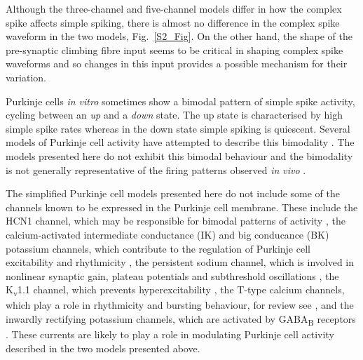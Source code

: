 \documentclass[utf8]{frontiersSCNS} %
\begin{document}
Although the three-channel and five-channel models differ in how the
complex spike affects simple spiking, there is almost no difference in
the complex spike waveform in the two models, Fig.~\ref{S2_Fig}. On
the other hand, the shape of the pre-synaptic climbing fibre input
seems to be critical in shaping complex spike waveforms and so changes
in this input provides a possible mechanism for their variation.

Purkinje cells \textsl{in vitro} sometimes show a bimodal pattern of
simple spike activity, cycling between an \textsl{up} and a
\textsl{down} state. The up state is characterised by high simple
spike rates whereas in the down state simple spiking is
quiescent. Several models of Purkinje cell activity have attempted to
describe this bimodality
\cite{Forrest2014,ForrestEtAl2012,LlinasSugimori1980b,LoewensteinEtAl2005,McKayEtAl2007,WilliamsEtAl2002}. The
models presented here do not exhibit this bimodal behaviour and the
bimodality is not generally representative of the firing patterns
observed \textsl{in vivo}
\cite{CerminaraRawson2004,McKayEtAl2007,SchonewilleEtAl2006}.

The simplified Purkinje cell models presented here do not include some
of the channels known to be expressed in the Purkinje cell
membrane. These include the HCN1 channel, which may be responsible for
bimodal patterns of activity \cite{LoewensteinEtAl2005}, the
calcium-activated intermediate conductance (IK) and big conducance
(BK) potassium channels, which contribute to the regulation of
Purkinje cell excitability and rhythmicity \cite{CheronEtAl2009}, the
persistent sodium channel, which is involved in nonlinear synaptic
gain, plateau potentials and subthreshold oscillations
\cite{KayEtAl1998}, the K\textsubscript{v}1.1 channel, which prevents
hyperexcitability \cite{ZhangEtAl1999}, the T-type calcium channels,
which play a role in rhythmicity and bursting behaviour, for review
see \cite{CainSnutch2010}, and the inwardly rectifying potassium
channels, which are activated by GABA\textsubscript{B} receptors
\cite{TabataEtAl2005}. These currents are likely to play a role in
modulating Purkinje cell activity described in the two models
presented above.


\end{document}
